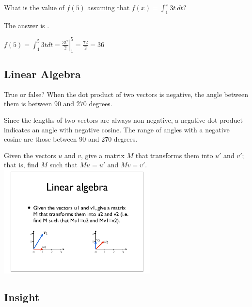 \documentclass{ximera}
\begin{document}
\begin{question}
What is the value of $f(5) $ assuming that $f(x) = \int_1^x 3t ~dt$?
\begin{solution}
The answer is .
\end{solution}
$f(5) = \int_1^5 3t dt = \left. \frac{3t^2}{2} \right|_1^5 = \frac{72}{2} = 36$
\end{question}

\subsection*{Linear Algebra}

\begin{question}
True or false?  When the dot product of two vectors is negative, the angle between them is between 90 and 270 degrees.
\begin{solution}
\begin{multiple-choice}
\end{multiple-choice}
\end{solution}
Since the lengths of two vectors are always non-negative, a negative dot product indicates an angle with negative cosine. The range of angles with a negative cosine are those between 90 and 270 degrees.
\end{question}

\begin{question}
Given the vectors $u$ and $v$, give a matrix $M$ that transforms them into $u'$ and $v'$; that is, find $M$ such that $M u=u'$ and $M v=v'$.
\includegraphics[width=0.6\textwidth]{fig.pdf}
\end{question}


\subsection*{Insight}
\end{document}
